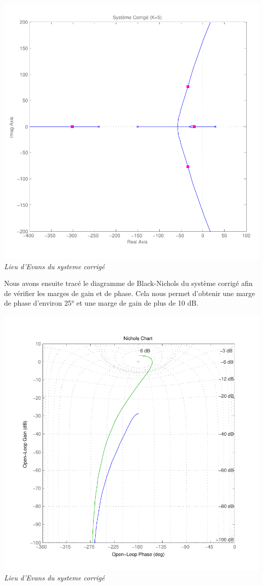 \documentclass[11pt, french]{article} %
\begin{document}
\newline
\begin{center}
\includegraphics[scale=0.50]{RL_Sys_AvPh_K5.pdf}
\\
\emph{Lieu d'Evans du systeme corrigé}
\end{center}

Nous avons ensuite tracé le diagramme de Black-Nichols du système corrigé afin de vérifier les marges de gain et de phase. Cela nous permet d'obtenir une marge de phase d'environ 25° et une marge de gain de plus de 10 dB.

\newline
\begin{center}
\includegraphics[scale=0.50]{MatBlack.pdf}
\\
\emph{Lieu d'Evans du systeme corrigé}
\end{center}
\end{document}
